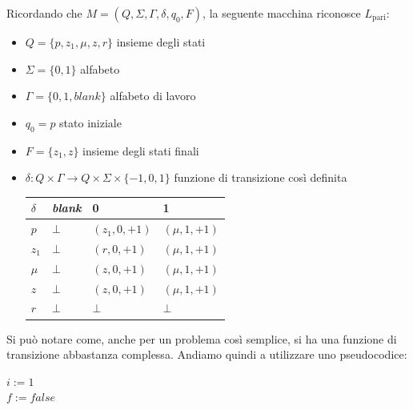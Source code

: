 Ricordando che $M = \left(Q, \Sigma, \Gamma, \delta, q_0, F\right)$, la seguente macchina riconosce $L_{\text{pari}}$:
\begin{itemize}
	\item $Q = \{p, z_1, \mu, z, r\}$ insieme degli stati
	\item $\Sigma = \{0,1\}$ alfabeto 
	\item $\Gamma = \{0,1, blank\}$ alfabeto di lavoro
	\item $q_0 = p$ stato iniziale
	\item $F = \{z_1, z\}$ insieme degli stati finali
	\item $\delta : Q \times \Gamma \rightarrow Q \times \Sigma \times \{-1, 0, 1\}$ funzione di transizione così definita
	\begin{center}
		\renewcommand{\arraystretch}{1.5}
		\begin{tabular}{| C{40000cm} | C{40000cm} | C{40000cm} | C{40000cm} |}
			\hline
			$\delta$ & \textit{blank} & 0 & 1 \\
			\hline
			$p$ & $\bot$ & $(z_1, 0, +1)$ & $(\mu, 1, +1)$ \\
			\hline
			$z_1$ & $\bot$ & $(r, 0, +1)$ & $(\mu, 1, +1)$ \\
			\hline
			$\mu$ & $\bot$ & $(z, 0, +1)$ & $(\mu, 1, +1)$ \\
			\hline
			$z$ & $\bot$ & $(z, 0, +1)$ & $(\mu, 1, +1)$ \\
			\hline
			$r$ & $\bot$ & $\bot$ & $\bot$ \\
			\hline
		\end{tabular}
	\end{center}
\end{itemize}

Si può notare come, anche per un problema così semplice, si ha una funzione di transizione abbastanza complessa. Andiamo quindi a utilizzare uno pseudocodice:
\begin{center}
	\begin{minipage}{.7\textwidth}
		\begin{tcolorbox}[
			colback=white,
			sharp corners,
			boxrule=.3mm,
			left=20pt,
			top=0pt,
			bottom=0pt,
			title=Parità$(n)$,
			colbacktitle=white,
			coltitle=black
			]
			\LinesNumbered
			\begin{algorithm}[H]
				\SetAlgoNoEnd
				$i:=1$ \\
				$f:=false$ \\
			\end{algorithm}
		\end{tcolorbox}
	\end{minipage}
\end{center}

